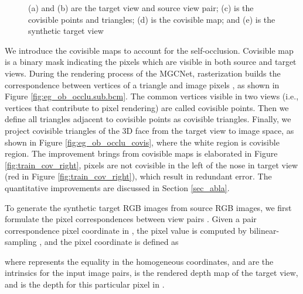 \documentclass[runningheads]{llncs}
\begin{document}
\begin{figure}[htbp]
	\centering  
	
	\caption{(a) and (b) are the target view and source view pair; (c) is the covisible points and triangles; (d) is the covisible map; and (e) is the synthetic target view}
	\label{fig:eg_ob_occlu_bcm}
\end{figure}


We introduce the covisible maps  to account for the self-occlusion. 
Covisible map is a binary mask indicating the pixels which are visible in both source and target views. 
During the rendering process of the MGCNet, rasterization builds the correspondence between vertices of a triangle and image pixels , as shown in Figure \ref{fig:eg_ob_occlu.sub.bcm}. 
The common vertices visible in two views (i.e., vertices that contribute to pixel rendering) are called covisible points. Then we define all triangles adjacent to covisible points as covisible triangles.
Finally, we project covisible triangles of the 3D face from the target view to image space, as shown in Figure \ref{fig:eg_ob_occlu_covis}, where the white region is covisible region. The improvement brings from covisible maps is elaborated in Figure \ref{fig:train_cov_right}, pixels are not covisible in the left of the nose in target view (red in Figure \ref{fig:train_cov_right}), which result in redundant error. The quantitative improvements are discussed in Section \ref{sec_abla}.


To generate the synthetic target RGB images from source RGB images, we first formulate the pixel correspondences between view pairs .
Given a pair correspondence pixel coordinate  in , the pixel value  is computed by bilinear-sampling \cite{jaderberg2015spatial}, and the pixel coordinate  is defined as

where  represents the equality in the homogeneous coordinates,  and  are the intrinsics for the input image pairs,  is the rendered depth map of the target view, and  is the depth for this particular pixel  in .
\end{document}
